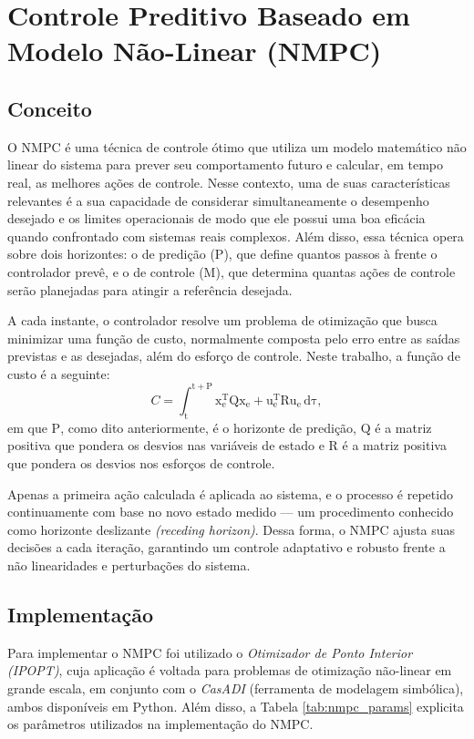 \section{Controle Preditivo Baseado em Modelo Não-Linear (NMPC)}
\subsection{Conceito}
O NMPC é uma técnica de controle ótimo que utiliza um modelo matemático não linear do sistema para 
prever seu comportamento futuro e calcular, em tempo real, as melhores ações de controle. Nesse contexto, 
uma de suas características relevantes é a sua capacidade de considerar simultaneamente o desempenho 
desejado e os limites operacionais de modo que ele possui uma boa eficácia quando confrontado com 
sistemas reais complexos. Além disso, essa técnica opera sobre dois horizontes: o de predição ($\mathrm{P}$), que define 
quantos passos à frente o controlador prevê, e o de controle ($\mathrm{M}$), que determina quantas ações de 
controle serão planejadas para atingir a referência desejada.

A cada instante, o controlador resolve um problema de otimização que busca minimizar uma função de custo, normalmente composta 
pelo erro entre as saídas previstas e as desejadas, além do esforço de controle. Neste trabalho, a 
função de custo é a seguinte:
\begin{equation*}
    C = \mathrm{\int_{t}^{t+P} x^{T}_{e}Qx_e+u^{T}_{e}Ru_e \,d\tau},
\end{equation*}
\noindent em que $\mathrm{P}$, como dito anteriormente, é o horizonte de predição, $\mathrm{Q}$ 
é a matriz positiva que pondera os desvios nas variáveis de estado e $\mathrm{R}$ é a matriz 
positiva que pondera os desvios nos esforços de controle.

Apenas a primeira ação calculada é aplicada ao sistema, e o processo é repetido continuamente 
com base no novo estado medido — um procedimento conhecido como horizonte deslizante 
\textit{(receding horizon)}. Dessa forma, o NMPC ajusta suas decisões a cada iteração, garantindo 
um controle adaptativo e robusto frente a não linearidades e perturbações do sistema.

\subsection{Implementação}
Para implementar o NMPC foi utilizado o \textit{Otimizador de Ponto Interior (IPOPT)}, cuja aplicação 
é voltada para problemas de otimização não-linear em grande escala, em conjunto com o \textit{CasADI} 
(ferramenta de modelagem simbólica), ambos disponíveis em Python. Além disso, a Tabela 
\ref{tab:nmpc_params} explicita os parâmetros utilizados na implementação do NMPC.

